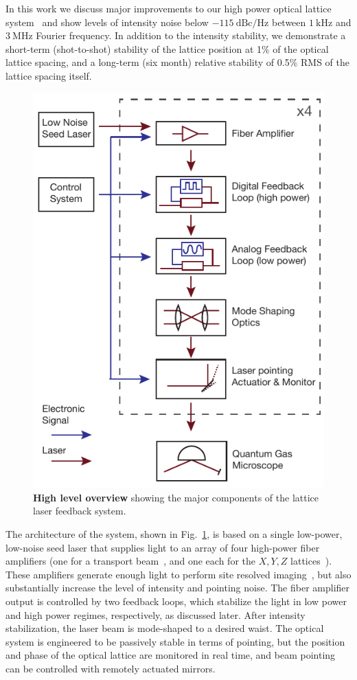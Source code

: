 \documentclass[twocolumn,aps,pra,showpacs,preprintnumbers,bibnotes]{revtex4-1}
\newcommand\unit[2]{\ensuremath{#1~\mathrm{{#2}}}}
\begin{document}
In this work we discuss major improvements to our high power optical lattice system~\cite{Blatt2015} and show levels of intensity noise below \unit{-115}{dBc/Hz} between \unit{1}{kHz} and \unit{3}{MHz} Fourier frequency.
In addition to the intensity stability, we demonstrate a short-term (shot-to-shot) stability of the lattice position at 1\% of the optical lattice spacing, and a long-term (six month) relative stability of 0.5\% RMS of the lattice spacing itself.

\begin{figure}[t]
  \begin{center}
    \includegraphics[width=0.85\columnwidth]{Figure1.pdf}
    \caption{\textbf{High level overview} showing the major components of the lattice laser feedback system.}\label{fig:high_level}
  \end{center}
\end{figure}

The architecture of the system, shown in Fig.~\ref{fig:high_level}, is based on a single low-power, low-noise seed laser that supplies light to an array of four high-power fiber amplifiers (one for a transport beam~\cite{Huber2014}, and one each for the $X,Y,Z$ lattices~\cite{Blatt2015,Parsons2016}).
These amplifiers generate enough light to perform site resolved imaging~\cite{Parsons2015}, but also substantially increase the level of intensity and pointing noise.
The fiber amplifier output is controlled by two feedback loops, which stabilize the light in low power and high power regimes, respectively, as discussed later.
After intensity stabilization, the laser beam is mode-shaped to a desired waist.
The optical system is engineered to be passively stable in terms of pointing, but the position and phase of the optical lattice are monitored in real time, and beam pointing can be controlled with remotely actuated mirrors.
\end{document}
